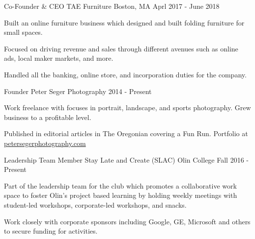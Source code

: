 

\begin{cventries}

  \cventry
    {Co-Founder \& CEO} %
    {TAE Furniture} %
    {Boston, MA} %
    {Aprl 2017 - June 2018} %
    {
      \begin{cvitems} %
        \item {Built an online furniture business which designed and built folding furniture for small spaces.}
        \item {Focused on driving revenue and sales through different avenues such as online ads, local maker markets, and more.}
        \item {Handled all the banking, online store, and incorporation duties for the company.}
      \end{cvitems}
    }

  \cventry
  {Founder} %
  {Peter Seger Photography} %
  {} %
  {2014 - Present} %
  {
    \begin{cvitems} %
      \item Work freelance with focuses in portrait, landscape, and sports photography. Grew business to a profitable level.
	    \item Published in editorial articles in The Oregonian covering a Fun Run. Portfolio at \href{www.petersegerphotography.com}{petersegerphotography.com}
    \end{cvitems}
  }


  \cventry
  {Leadership Team Member} %
  {Stay Late and Create (SLAC)} %
  {Olin College} %
  {Fall 2016 - Present} %
  {
    \begin{cvitems} %
      \item Part of the leadership team for the club which promotes a collaborative work space to foster Olin's project based learning by holding weekly meetings with student-led workshops, corporate-led workshops, and snacks. 
	    \item Work closely with corporate sponsors including Google, GE, Microsoft and others to secure funding for activities.
    \end{cvitems}
  }

\end{cventries}
